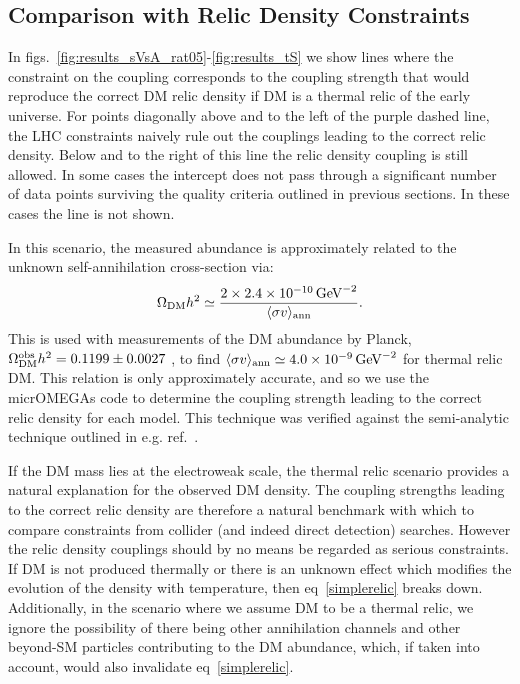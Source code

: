 \subsection{Comparison with Relic Density Constraints}


In figs.~\ref{fig:results_sVsA_rat05}-\ref{fig:results_tS} we show lines where the constraint on the coupling corresponds to the coupling strength that would reproduce the correct DM relic density if DM is a thermal relic of the early universe. For points diagonally above and to the left of the purple dashed line, the LHC constraints naively rule out the couplings leading to the correct relic density. Below and to the right of this line the relic density coupling is still allowed. In some cases the intercept does not pass through a significant number of data points surviving the quality criteria outlined in previous sections. In these cases the line is not shown.

In this scenario, the measured abundance is approximately related to the unknown self-annihilation cross-section via:
%
\begin{equation}
  \Omega_{\rm DM}h^2\simeq \frac{2\times2.4\times 10^{-10}\,{\rm GeV}^{-2}}{\langle\sigma v\rangle_{\rm ann}}.
  \label{simplerelic}
\end{equation}
%
This is used with measurements of the DM abundance by Planck, $\Omega_{\rm DM}^{\rm obs}h^2=0.1199\pm0.0027$ \cite{Ade:2013zuv}, to find $\langle\sigma v\rangle_{\rm ann}\simeq 4.0\times 10^{-9}\,{\rm GeV}^{-2}$ for thermal relic DM.
%
This relation is only approximately accurate, and so we use the micrOMEGAs code \cite{Belanger:2014vza} to determine the coupling strength leading to the correct relic density for each model. This technique was verified against the semi-analytic technique outlined in e.g. ref.~\cite{Busoni:2014gta}.

If the DM mass lies at the electroweak scale, the thermal relic scenario provides a natural explanation for the observed DM density. The coupling strengths leading to the correct relic density are therefore a natural benchmark with which to compare constraints from collider (and indeed direct detection) searches. However the relic density couplings should by no means be regarded as serious constraints. If DM is not produced thermally or there is an unknown effect which modifies the evolution of the density with temperature, then eq~\ref{simplerelic} breaks down. Additionally, in the scenario where we assume DM to be a thermal relic, we ignore the possibility of there being other annihilation channels and other beyond-SM particles contributing to the DM abundance, which, if taken into account, would also invalidate eq~\ref{simplerelic}.

